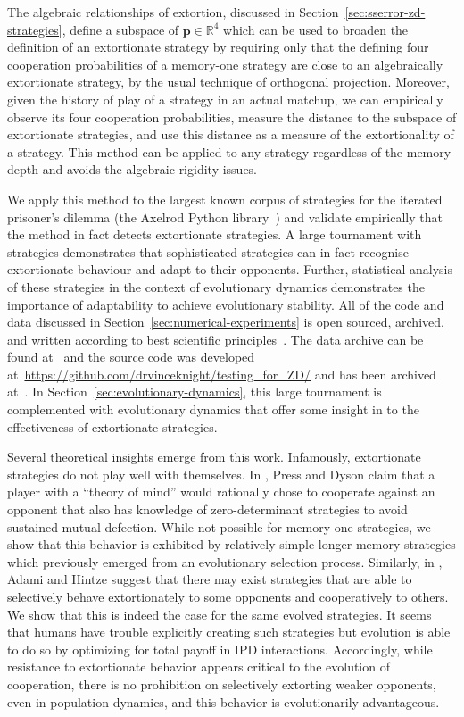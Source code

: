 \documentclass[a4paper]{article}
\begin{document}
The algebraic relationships of extortion, discussed in
Section~\ref{sec:sserror-zd-strategies}, define a subspace of
\(\textbf{p}\in\mathbb{R}^4\) which can be used to broaden the definition of an extortionate
strategy by requiring only that the defining four cooperation probabilities of a
memory-one strategy are close to an algebraically extortionate strategy, by the usual
technique of orthogonal projection. Moreover, given the history of play of a
strategy in an actual matchup, we can empirically observe its four
cooperation probabilities, measure the distance to the subspace of extortionate
strategies, and use this distance as a measure of the extortionality of a
strategy. This method can be applied to any strategy regardless of the memory
depth and avoids the algebraic rigidity issues.

We apply this method to the largest known corpus of strategies for the iterated
prisoner's dilemma (the Axelrod Python library~\cite{Knight2016, Knight2018})
and validate empirically that the method in fact detects extortionate strategies.
A large tournament with 
strategies demonstrates that sophisticated
strategies can in fact recognise extortionate behaviour and adapt to their
opponents. Further, statistical analysis of these strategies in the context of
evolutionary dynamics demonstrates the importance of adaptability to achieve
evolutionary stability. All of the code and data discussed in
Section~\ref{sec:numerical-experiments} is open sourced, archived, and written
according to best scientific principles~\cite{Wilson2014}. The data archive can
be found at~\cite{vincent_knight_2018_1297075} and the source code was developed
at~\url{https://github.com/drvinceknight/testing_for_ZD/} and has been archived
at~\cite{vincent_knight_2019_2598534}. In
Section~\ref{sec:evolutionary-dynamics}, this large tournament is complemented
with evolutionary dynamics that offer some insight in to the
effectiveness of extortionate strategies.

Several theoretical insights emerge from this work. Infamously, extortionate
strategies do not play well with themselves. In \cite{Press2012},
Press and Dyson claim that a player with a ``theory of mind'' would
rationally chose to cooperate against an opponent that also has knowledge
of zero-determinant strategies to avoid sustained mutual defection. While not
possible for memory-one strategies, we show that this behavior is exhibited by
relatively simple longer memory strategies which previously emerged from an
evolutionary selection process. Similarly, in
\cite{adami2013evolutionary}, Adami and Hintze suggest that there may exist
strategies that are able to selectively behave extortionately to some opponents
and cooperatively to others. We show that this is indeed the case for the same
evolved strategies. It seems that humans have trouble explicitly creating such
strategies but evolution is able to do so by optimizing for total payoff in IPD
interactions. Accordingly, while resistance to extortionate behavior appears
critical to the evolution of cooperation, there is no prohibition on selectively
extorting weaker opponents, even in population dynamics, and this behavior is
evolutionarily advantageous.
\end{document}
